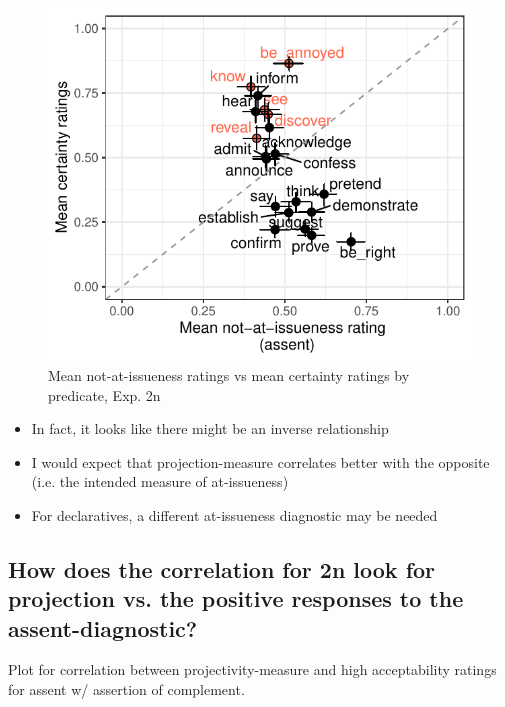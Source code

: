 \documentclass[11pt]{article}
\begin{document}
			\begin{figure}[h]
				\centering
				\includegraphics[]{figures/n2-correl.pdf}
				\caption{Mean not-at-issueness ratings vs mean certainty ratings by predicate, Exp. 2n}
				\label{fig:figure1}
			\end{figure}

			\begin{itemize}
				\item In fact, it looks like there might be an inverse relationship
				\item I would expect that projection-measure correlates better with the opposite (i.e. the intended measure of at-issueness)
				\item For declaratives, a different at-issueness diagnostic may be needed
				
			\end{itemize}

	\subsection{How does the correlation for 2n look for projection vs. the positive responses to the assent-diagnostic?} %
		Plot for correlation between projectivity-measure and high acceptability ratings for assent w/ assertion of complement.
\end{document}

